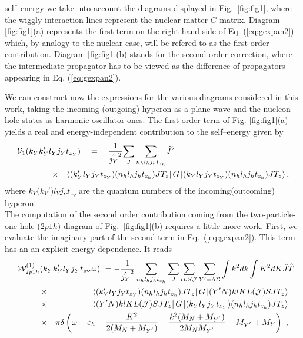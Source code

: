 self--energy we take into account 
the diagrams
displayed in Fig.~\ref{fig:fig1}, where the wiggly interaction lines 
represent the nuclear matter $G$-matrix.  Diagram \ref{fig:fig1}(a)
represents the first term on the right hand side
of Eq. (\ref{eq:gexpan2}) which, by analogy to the nuclear case, will be
refered to as the first order contribution. Diagram \ref{fig:fig1}(b)
stands for the
second order correction, where the
intermediate propagator has to be viewed as the difference of
propagators appearing in Eq. (\ref{eq:gexpan2}).

We can construct now the expressions for the
various diagrams considered in this work, taking the incoming
(outgoing) hyperon as a plane wave and the nucleon hole states as
harmonic oscillator ones. The first order term of Fig.
\ref{fig:fig1}(a) yields
a real and energy-independent contribution to the self--energy given by
\begin{eqnarray}
\lefteqn{  {\cal V}_{1}(k_{Y}k_{Y}'l_{Y}j_{Y}
   t_{z_{Y}})\quad = \quad \frac{1}{\hat{j_{Y}}^2}
  {\displaystyle \sum_{J}\sum_{n_hl_hj_ht_{z_h}}}\hat{J}^2}\hspace{1.5cm}
\nonumber \\
  & \times & \left\langle
(k_{Y}'l_{Y}j_{Y}t_{z_{Y}})
  (n_hl_hj_ht_{z_h})JT_z \right |
   G\left | (k_{Y}l_{Y}j_{Y}t_{z_{Y}})
   (n_hl_hj_ht_{z_h})JT_z \right \rangle ,
\label{eq:hf}
\end{eqnarray} 
where $k_{Y}$($k_{Y}'$)$l_{Y}$$j_{Y}$$t_{z_{Y}}$ are
the quantum numbers of the incoming(outcoming) hyperon. \\
The computation of the second order contribution coming from
the two-particle-one-hole ($2p1h$) diagram of Fig.~\ref{fig:fig1}(b)
requires a little more work. First, we evaluate the imaginary part of the 
second term in Eq.\ (\ref{eq:gexpan2}). This term has an
an explicit energy dependence. It reads   
\begin{eqnarray}
\lefteqn{{\cal W}^{(1)}_{2p1h}(k_{Y}k_{Y}'l_{Y}j_{Y}
      t_{z_{Y}}\omega) \ = 
      {\displaystyle -\frac{1}
      {\hat{j_{Y}}^2}\sum_{n_hl_hj_ht_{z_h}}
      \sum_{J}\sum_{lLS{\cal J}}\sum_{Y'=\Lambda\Sigma}\int k^{2}dk
      \int K^{2}dK\hat{J}\hat{T}}}\hspace{1cm}\nonumber \\
      &\times& \left\langle (k_{Y}'l_{Y}j_{Y}
      t_{z_{Y}})(n_hl_hj_ht_{z_h})JT_z\right |
      G\left | (Y'N)klKL({\cal J})SJT_z \right \rangle\nonumber \\
      &\times& \left\langle (Y'N)klKL({\cal J})SJT_z \right | G
      \left | (k_{Y}l_{Y}j_{Y}
      t_{z_{Y}})(n_hl_hj_ht_{z_h})JT_z \right \rangle \nonumber
      \\ &\times& \pi\delta
      \left(\omega +\varepsilon_h -\frac{K^2}{2(M_N+M_{Y^{'}})} -
      \frac{k^2(M_N+M_{Y^{'}})}{2M_NM_{Y^{'}}}-M_{Y^{'}}+M_Y \right) \ ,
   \label{eq:2p1h}
\end{eqnarray} \\
